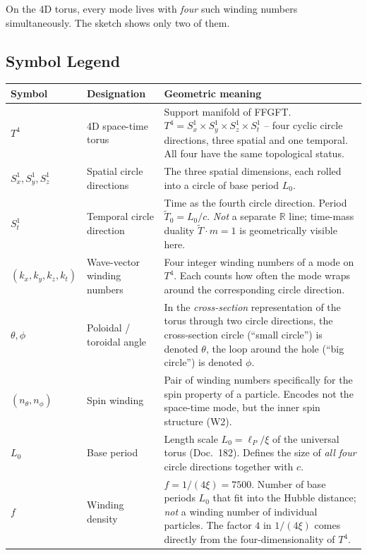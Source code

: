 On the 4D torus, every mode lives with \emph{four} such winding
numbers simultaneously. The sketch shows only two of them.

\subsection*{Symbol Legend}

\begin{center}
\renewcommand{\arraystretch}{1.4}
{\footnotesize
\begin{tabular}{>{\raggedright\arraybackslash}p{2.6cm}>{\raggedright\arraybackslash}p{2.8cm}>{\raggedright\arraybackslash}p{7.4cm}}
\toprule
\textbf{Symbol} & \textbf{Designation} & \textbf{Geometric meaning} \\
\midrule
$T^4$ &
  4D space-time torus &
  Support manifold of FFGFT. $T^4 = S^1_x \times S^1_y \times S^1_z \times S^1_t$ -- four cyclic circle directions, three spatial and one temporal. All four have the same topological status. \\
$S^1_x, S^1_y, S^1_z$ &
  Spatial circle directions &
  The three spatial dimensions, each rolled into a circle of base period $L_0$. \\
$S^1_t$ &
  Temporal circle direction &
  Time as the fourth circle direction. Period $\tilde T_0 = L_0/c$. \emph{Not} a separate $\mathbb{R}$ line; time-mass duality $\tilde T \cdot m = 1$ is geometrically visible here. \\
$(k_x, k_y, k_z, k_t)$ &
  Wave-vector winding numbers &
  Four integer winding numbers of a mode on $T^4$. Each counts how often the mode wraps around the corresponding circle direction. \\
$\theta, \phi$ &
  Poloidal / toroidal angle &
  In the \emph{cross-section} representation of the torus through two circle directions, the cross-section circle (\enquote{small circle}) is denoted $\theta$, the loop around the hole (\enquote{big circle}) is denoted $\phi$. \\
$(n_\theta, n_\phi)$ &
  Spin winding &
  Pair of winding numbers specifically for the spin property of a particle. Encodes not the space-time mode, but the inner spin structure (W2). \\
$L_0$ &
  Base period &
  Length scale $L_0 = \ell_P/\xi$ of the universal torus (Doc.~182). Defines the size of \emph{all four} circle directions together with $c$. \\
$f$ &
  Winding density &
  $f = 1/(4\xi) = 7500$. Number of base periods $L_0$ that fit into the Hubble distance; \emph{not} a winding number of individual particles. The factor $4$ in $1/(4\xi)$ comes directly from the four-dimensionality of $T^4$. \\
\bottomrule
\end{tabular}
}
\renewcommand{\arraystretch}{1.0}
\end{center}

